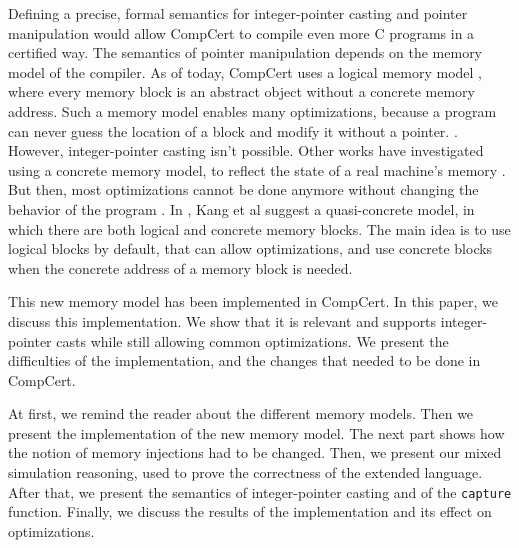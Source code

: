 Defining a precise, formal semantics for integer-pointer casting and pointer manipulation would allow CompCert to compile even more C programs in a certified way.
The semantics of pointer manipulation depends on the memory model of the compiler.
As of today, CompCert uses a logical memory model \cite{leroy:hal-00703441}, where every memory block is an abstract object without a concrete memory address. Such a memory model enables many optimizations, because a program can never guess the location of a block and modify it without a pointer. .
However, integer-pointer casting isn't possible.
Other works have investigated using a concrete memory model, to reflect the state of a real machine's memory . But then, most optimizations cannot be done anymore without changing the behavior of the program .
In \cite{DBLP:conf/pldi/KangHMGZV15}, Kang et al suggest a quasi-concrete model, in which there are both logical and concrete memory blocks. The main idea is to use logical blocks by default, that can allow optimizations, and use concrete blocks when the concrete address of a memory block is needed.

This new memory model has been implemented in CompCert.
In this paper, we discuss this implementation.
We show that it is relevant and supports integer-pointer casts while still allowing common optimizations.
We present the difficulties of the implementation, and the changes that needed to be done in CompCert.

At first, we remind the reader about the different memory models.
Then we present the implementation of the new memory model. The next part shows how the notion of memory injections had to be changed. Then, we present our mixed simulation reasoning, used to prove the correctness of the extended language. After that, we present the semantics of integer-pointer casting and of the \texttt{capture} function.
Finally, we discuss the results of the implementation and its effect on optimizations. 
